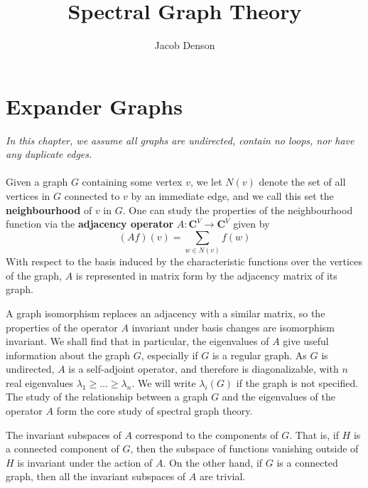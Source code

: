 

\title{Spectral Graph Theory}
\author{Jacob Denson}



\maketitle
\tableofcontents
{}

\chapter{Expander Graphs}

{\it In this chapter, we assume all graphs are undirected, contain no loops, nor have any duplicate edges.}
\\\\
Given a graph $G$ containing some vertex $v$, we let $N(v)$ denote the set of all vertices in $G$ connected to $v$ by an immediate edge, and we call this set the {\bf neighbourhood} of $v$ in $G$. One can study the properties of the neighbourhood function via the {\bf adjacency operator} $A: \mathbf{C}^V \to \mathbf{C}^V$ given by
%
\[ (Af)(v) = \sum_{w \in N(v)} f(w) \]
%
With respect to the basis induced by the characteristic functions over the vertices of the graph, $A$ is represented in matrix form by the adjacency matrix of its graph.

A graph isomorphism replaces an adjacency with a similar matrix, so the properties of the operator $A$ invariant under basis changes are isomorphism invariant. We shall find that in particular, the eigenvalues of $A$ give useful information about the graph $G$, especially if $G$ is a regular graph. As $G$ is undirected, $A$ is a self-adjoint operator, and therefore is diagonalizable, with $n$ real eigenvalues $\lambda_1 \geq \dots \geq \lambda_n$. We will write $\lambda_i(G)$ if the graph is not specified. The study of the relationship between a graph $G$ and the eigenvalues of the operator $A$ form the core study of spectral graph theory.

\begin{example}
    The invariant subspaces of $A$ correspond to the components of $G$. That is, if $H$ is a connected component of $G$, then the subspace of functions vanishing outside of $H$ is invariant under the action of $A$. On the other hand, if $G$ is a connected graph, then all the invariant subspaces of $A$ are trivial.
\end{example}

